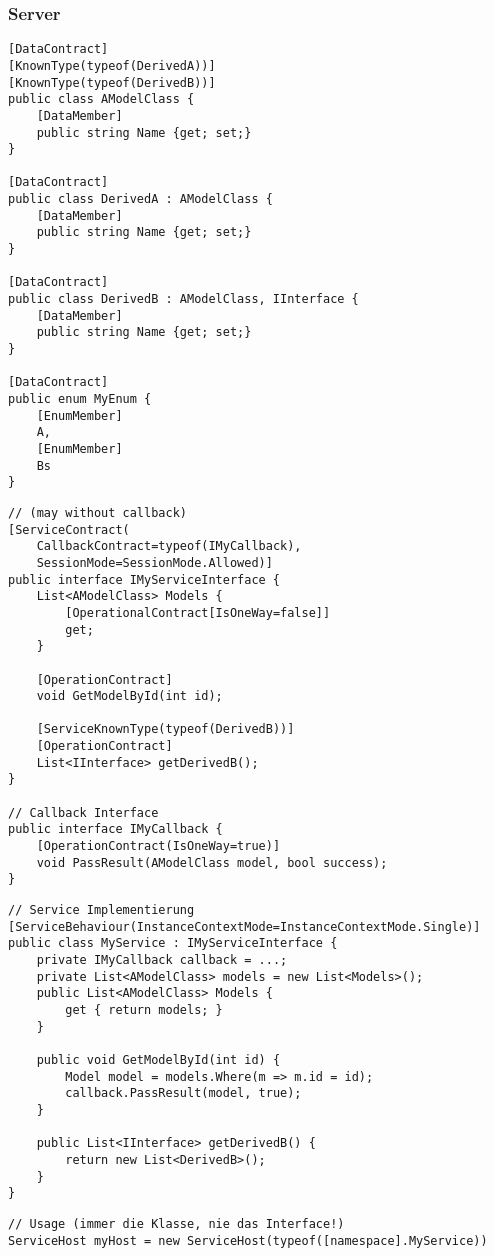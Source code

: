\subsubsection{Server}
\begin{lstlisting}[caption=Data Transfer Objects (DTO)]
[DataContract]
[KnownType(typeof(DerivedA))]
[KnownType(typeof(DerivedB))]
public class AModelClass {
	[DataMember]
	public string Name {get; set;}	
}

[DataContract]
public class DerivedA : AModelClass {
	[DataMember]
	public string Name {get; set;}
}

[DataContract]
public class DerivedB : AModelClass, IInterface {
	[DataMember]
	public string Name {get; set;}
}

[DataContract]
public enum MyEnum {
	[EnumMember]
	A,
	[EnumMember]
	Bs
}
\end{lstlisting}
\begin{lstlisting}[caption=Service Interface]
// (may without callback)
[ServiceContract(
	CallbackContract=typeof(IMyCallback),
	SessionMode=SessionMode.Allowed)]
public interface IMyServiceInterface {
	List<AModelClass> Models {
		[OperationalContract[IsOneWay=false]]
		get;
	}
	
	[OperationContract]
	void GetModelById(int id);
	
	[ServiceKnownType(typeof(DerivedB))]
	[OperationContract]
	List<IInterface> getDerivedB();
}

// Callback Interface
public interface IMyCallback {
	[OperationContract(IsOneWay=true)]
	void PassResult(AModelClass model, bool success);
}

\end{lstlisting}
\begin{lstlisting}[caption=Service Implementation]
// Service Implementierung
[ServiceBehaviour(InstanceContextMode=InstanceContextMode.Single)]
public class MyService : IMyServiceInterface {
	private IMyCallback callback = ...;
	private List<AModelClass> models = new List<Models>();
	public List<AModelClass> Models {
		get { return models; }
	}
	
	public void GetModelById(int id) {
		Model model = models.Where(m => m.id = id);
		callback.PassResult(model, true);
	}
	
	public List<IInterface> getDerivedB() {
		return new List<DerivedB>();
	}
}

\end{lstlisting}
\begin{lstlisting}
// Usage (immer die Klasse, nie das Interface!)
ServiceHost myHost = new ServiceHost(typeof([namespace].MyService))
\end{lstlisting}

